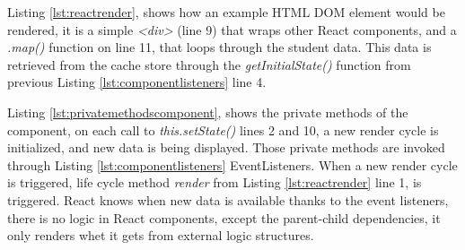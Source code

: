 Listing \ref{lst:reactrender}, shows how an example HTML DOM element would be rendered, it is a simple \emph{<div>} (line 9) that wraps other React components, and a \emph{.map()} function on line 11, that loops through the student data. This data is retrieved from the cache store through the \emph{getInitialState()} function from previous Listing \ref{lst:componentlisteners} line 4.




Listing \ref{lst:privatemethodscomponent}, shows the private methods of the component, on each call to \emph{this.setState()} lines 2 and 10, a new render cycle is initialized, and new data is being displayed. Those private methods are invoked through Listing \ref{lst:componentlisteners} EventListeners.
When a new render cycle is triggered, life cycle method \emph{render} from Listing \ref{lst:reactrender} line 1, is triggered. React knows when new data is available thanks to the event listeners, there is no logic in React  components, except the parent-child dependencies, it only renders whet it gets from external logic structures.
